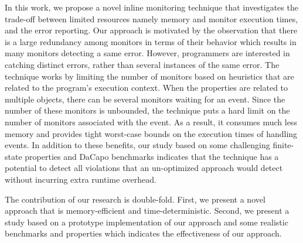 In this work, we propose a novel inline monitoring technique that investigates 
the trade-off between limited resources namely memory and monitor execution
times, and  the error reporting. Our approach is motivated by the 
observation that there is a large redundancy among monitors in terms of their 
behavior which results in many monitors detecting a same error. However, 
programmers are interested in catching distinct errors, rather than several 
instances of the same error. The technique works by limiting the number of 
monitors based on heuristics that are related to the program's execution 
context. When the properties are related to multiple objects, there can be 
several monitors waiting for an event. Since the number of these 
monitors is unbounded, the technique puts a hard limit on the number of monitors
associated with the event. As a result, it consumes much less memory and provides 
tight worst-case bounds on the execution times of handling events. In addition to
these benefits, our study based on some challenging finite-state properties
and DaCapo benchmarks indicates that the technique has a potential to detect
all violations that an un-optimized approach would detect without
incurring extra runtime overhead.

The contribution of our research is double-fold. First, we present a novel 
approach that is memory-efficient and time-deterministic. Second, we present a study 
based on a prototype implementation of our approach and some realistic benchmarks 
and properties which indicates the effectiveness of our approach.





